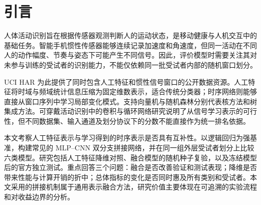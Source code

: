 \section{引言}
人体活动识别旨在根据传感器观测判断人的运动状态，是移动健康与人机交互中的基础任务。智能手机惯性传感器能够连续记录加速度和角速度，但同一活动在不同人的动作幅度、节奏与姿态下可能产生不同信号。因此，评价模型时需要关注其对未参与训练的受试者的识别能力，不能仅依赖同一批受试者内部的随机窗口划分。

UCI HAR 为此提供了同时包含人工特征和惯性信号窗口的公开数据资源\cite{uci,anguita2013}。人工特征将时域与频域统计信息压缩为固定维数表示，适合传统分类器；时序网络则能够直接从窗口序列中学习局部变化模式。支持向量机与随机森林分别代表核方法和树集成方法\cite{cortes1995,breiman2001}。可穿戴活动识别中的卷积与循环网络研究说明了从信号学习表示的可行性\cite{ordonez2016}，但不同数据集、输入通道及划分协议下的分数不能直接作为统一排名依据。

本文考察人工特征表示与学习得到的时序表示是否具有互补性。以逻辑回归为强基准，构建常见的 MLP--CNN 双分支拼接网络，并在同一组外层受试者划分上比较六类模型。研究包括人工特征降维对照、融合模型的随机种子复验，以及冻结模型后的官方独立测试。重点回答三个问题：融合是否改善验证和测试表现；降维是否带来性能与计算开销的折中；总体指标的变化是否同时惠及所有类别和受试者。本文采用的拼接机制属于通用表示融合方法，研究价值主要体现在可追溯的实验流程和对收益边界的分析。
